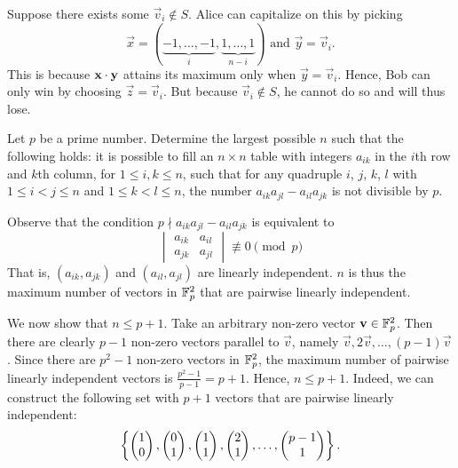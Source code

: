 Suppose there exists some $\vec v_i \notin S$. Alice can capitalize on this by picking \[\vec x = (\underbrace{-1, \ldots, -1}_{i}, \underbrace{1, \ldots, 1}_{n-i}) \text{ and } \vec y = \vec v_i.\] This is because $\mathbf{x} \cdot \mathbf{y}$ attains its maximum only when $\vec y = \vec v_i$. Hence, Bob can only win by choosing $\vec z = \vec v_i$. But because $\vec v_i \notin S$, he cannot do so and will thus lose.

\begin{question}[$p+1$]\label{A::2024-O-2-5}
    Let $p$ be a prime number. Determine the largest possible $n$ such that the following holds: it is possible to fill an $n \times n$ table with integers $a_{ik}$ in the $i$th row and $k$th column, for $1 \leq i, k \leq n$, such that for any quadruple $i$, $j$, $k$, $l$ with $1 \leq i < j \leq n$ and $1 \leq k < l \leq n$, the number $a_{ik}a_{jl} - a_{il}a_{jk}$ is not divisible by $p$.
\end{question}


 Observe that the condition $p \nmid a_{ik}a_{jl} - a_{il}a_{jk}$ is equivalent to \[
\begin{vmatrix}
    a_{ik} & a_{il}\\
    a_{jk} & a_{jl}
\end{vmatrix} \not\equiv 0 \pmod{p}\] That is, $(a_{ik}, a_{jk})$ and $(a_{il}, a_{jl})$ are linearly independent. $n$ is thus the maximum number of vectors in $\mathbb{F}_p^2$ that are pairwise linearly independent. 

We now show that $n \leq p + 1$. Take an arbitrary non-zero vector $\mathbf{v} \in \mathbb{F}_p^2$. Then there are clearly $p-1$ non-zero vectors parallel to $\vec v$, namely $\vec v, 2\vec v, \ldots, (p-1)\vec v$. Since there are $p^2 - 1$ non-zero vectors in $\mathbb{F}_p^2$, the maximum number of pairwise linearly independent vectors is $\frac{p^2 - 1}{p - 1} = p + 1$. Hence, $n \leq p+1$. Indeed, we can construct the following set with $p+1$ vectors that are pairwise linearly independent: \[\left\lbrace \begin{pmatrix} 1 \\ 0 \end{pmatrix}, \begin{pmatrix} 0 \\ 1 \end{pmatrix}, \begin{pmatrix} 1 \\ 1 \end{pmatrix}, \begin{pmatrix} 2 \\ 1 \end{pmatrix}, \ldots, \begin{pmatrix} p-1 \\ 1 \end{pmatrix} \right\rbrace.\]

